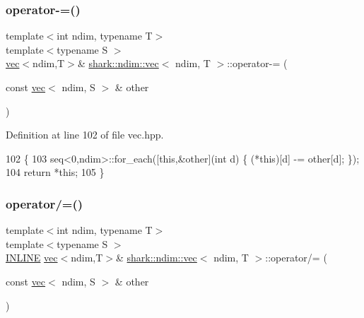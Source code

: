 \hypertarget{structshark_1_1ndim_1_1vec_accad5ec69cc6833eae34802f1a7c81ac}{}\label{structshark_1_1ndim_1_1vec_accad5ec69cc6833eae34802f1a7c81ac} 
\subsubsection{\texorpdfstring{operator-\/=()}{operator-=()}\hspace{0.1cm}{\footnotesize\ttfamily [2/2]}}
{\footnotesize\ttfamily template$<$int ndim, typename T$>$ \\
template$<$typename S $>$ \\
\hyperlink{structshark_1_1ndim_1_1vec}{vec}$<$ndim,T$>$\& \hyperlink{structshark_1_1ndim_1_1vec}{shark\+::ndim\+::vec}$<$ ndim, T $>$\+::operator-\/= (\begin{DoxyParamCaption}\item[{const \hyperlink{structshark_1_1ndim_1_1vec}{vec}$<$ ndim, S $>$ \&}]{other }\end{DoxyParamCaption})\hspace{0.3cm}{\ttfamily [inline]}}



Definition at line 102 of file vec.\+hpp.


\begin{DoxyCode}
102                                                                             \{
103             seq<0,ndim>::for\_each([\textcolor{keyword}{this},&other](\textcolor{keywordtype}{int} d) \{ (*this)[d] -= other[d]; \});
104             \textcolor{keywordflow}{return} *\textcolor{keyword}{this};
105         \}
\end{DoxyCode}
\hypertarget{structshark_1_1ndim_1_1vec_a640e4ea895ad8b14a259249227bc9290}{}\label{structshark_1_1ndim_1_1vec_a640e4ea895ad8b14a259249227bc9290} 
\subsubsection{\texorpdfstring{operator/=()}{operator/=()}\hspace{0.1cm}{\footnotesize\ttfamily [1/2]}}
{\footnotesize\ttfamily template$<$int ndim, typename T$>$ \\
template$<$typename S $>$ \\
\hyperlink{common_8hpp_a2eb6f9e0395b47b8d5e3eeae4fe0c116}{I\+N\+L\+I\+NE} \hyperlink{structshark_1_1ndim_1_1vec}{vec}$<$ndim,T$>$\& \hyperlink{structshark_1_1ndim_1_1vec}{shark\+::ndim\+::vec}$<$ ndim, T $>$\+::operator/= (\begin{DoxyParamCaption}\item[{const \hyperlink{structshark_1_1ndim_1_1vec}{vec}$<$ ndim, S $>$ \&}]{other }\end{DoxyParamCaption})}

